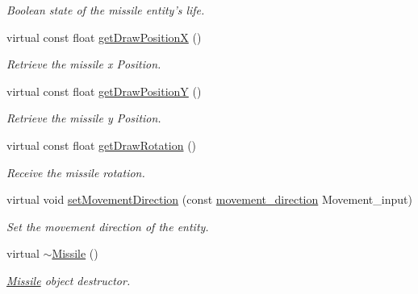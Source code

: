 \begin{DoxyCompactItemize}
\begin{DoxyCompactList}\small\item\em Boolean state of the missile entity's life. \end{DoxyCompactList}\item 
virtual const float \hyperlink{classMissile_a8e8d526d7578cfbabbd5bf1bdb9727bc}{get\-Draw\-Position\-X} ()
\begin{DoxyCompactList}\small\item\em Retrieve the missile x Position. \end{DoxyCompactList}\item 
virtual const float \hyperlink{classMissile_ad609bee2bfaf610824f32c15430fa6d8}{get\-Draw\-Position\-Y} ()
\begin{DoxyCompactList}\small\item\em Retrieve the missile y Position. \end{DoxyCompactList}\item 
virtual const float \hyperlink{classMissile_ab606b0b4f38c821063f210625f926374}{get\-Draw\-Rotation} ()
\begin{DoxyCompactList}\small\item\em Receive the missile rotation. \end{DoxyCompactList}\item 
virtual void \hyperlink{classMissile_a5bff45d0243e353acdf610fdade02bb0}{set\-Movement\-Direction} (const \hyperlink{Structures_8h_a0d0b88f27f3adf9452879b5d9f829026}{movement\-\_\-direction} Movement\-\_\-input)
\begin{DoxyCompactList}\small\item\em Set the movement direction of the entity. \end{DoxyCompactList}\item 
virtual \hyperlink{classMissile_ad42379e48a46ec3556056f98ce8bd912}{$\sim$\-Missile} ()
\begin{DoxyCompactList}\small\item\em \hyperlink{classMissile}{Missile} object destructor. \end{DoxyCompactList}\end{DoxyCompactItemize}

